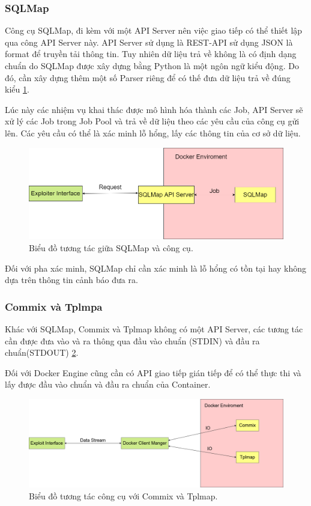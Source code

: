 \documentclass[./../main.tex]{subfiles}
\begin{document}
\subsubsection{SQLMap}
Công cụ SQLMap, đi kèm với một API Server nên việc giao tiếp có thể thiết
lập qua công API Server này. API Server sử dụng là REST-API sử dụng JSON
là format để truyền tải thông tin. Tuy nhiên dữ liệu trả về không là có
định dạng chuẩn do SQLMap được xây dựng bằng Python là một ngôn ngữ kiểu
động. Do đó, cần xây dựng thêm một số Parser riêng để có thế đưa dữ liệu
trả về đúng kiểu \ref{fig:sqlmap}.

Lúc này các nhiệm vụ khai thác được mô hình hóa thành các Job, API Server
sẽ xử lý các Job trong Job Pool và trả về dữ liệu theo các yêu cầu của công
cụ gửi lên. Các yêu cầu có thể là xác minh lỗ hổng, lấy các thông tin của
cơ sở dữ liệu.


\begin{figure}[ht!]
	\includegraphics[width=\linewidth]{./images/SQLMap.png}
	\caption{Biểu đồ tương tác giữa SQLMap và công cụ.}
	\label{fig:sqlmap}
\end{figure}

Đối với pha xác minh, SQLMap chỉ cần xác minh là lỗ hổng có tồn tại
hay không dựa trên thông tin cảnh báo đưa ra.
\subsubsection{Commix và Tplmpa}
Khác với SQLMap, Commix và Tplmap không có một API Server, các tương
tác cần được đưa vào và ra thông qua đầu vào chuẩn (STDIN) và đầu ra
chuẩn(STDOUT) \ref{fig:commix_tplmap}.

Đối với Docker Engine cũng cần có API giao tiếp gián tiếp để có thể thực
thi và lấy được đầu vào chuẩn và đầu ra chuẩn của Container.


\begin{figure}[ht!]
	\includegraphics[width=\linewidth]{./images/DockerIO.png}
	\caption{Biểu đồ tương tác công cụ với Commix và Tplmap.}
	\label{fig:commix_tplmap}
\end{figure}
\end{document}
